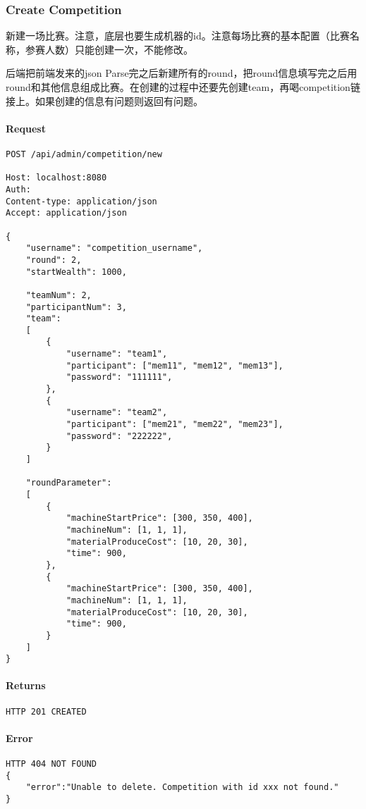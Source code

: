 \documentclass{article}
\begin{document}
\subsubsection{Create Competition}
新建一场比赛。注意，底层也要生成机器的id。注意每场比赛的基本配置（比赛名称，参赛人数）只能创建一次，不能修改。

后端把前端发来的json Parse完之后新建所有的round，把round信息填写完之后用round和其他信息组成比赛。在创建的过程中还要先创建team，再喝competition链接上。如果创建的信息有问题则返回有问题。

\paragraph*{Request}
\begin{lstlisting}
POST /api/admin/competition/new

Host: localhost:8080
Auth:
Content-type: application/json
Accept: application/json

{
    "username": "competition_username",
    "round": 2,
    "startWealth": 1000,

    "teamNum": 2,
    "participantNum": 3,
    "team":
    [
        {
            "username": "team1",
            "participant": ["mem11", "mem12", "mem13"],
            "password": "111111",
        },
        {
            "username": "team2",
            "participant": ["mem21", "mem22", "mem23"],
            "password": "222222",
        }
    ]

    "roundParameter":
    [
        {
            "machineStartPrice": [300, 350, 400],
            "machineNum": [1, 1, 1],
            "materialProduceCost": [10, 20, 30],
            "time": 900,
        },
        {
            "machineStartPrice": [300, 350, 400],
            "machineNum": [1, 1, 1],
            "materialProduceCost": [10, 20, 30],
            "time": 900,
        }
    ]
}
\end{lstlisting}

\paragraph*{Returns}
\begin{lstlisting}
HTTP 201 CREATED

\end{lstlisting}

\paragraph*{Error}
\begin{lstlisting}
HTTP 404 NOT FOUND
{
    "error":"Unable to delete. Competition with id xxx not found."
}
\end{lstlisting}
\end{document}

